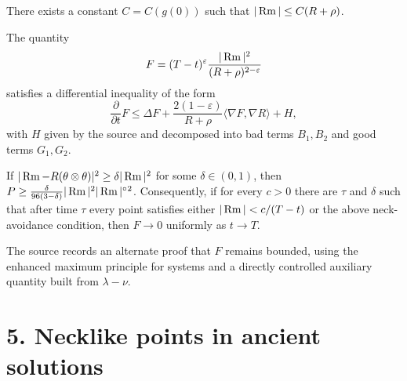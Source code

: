 \begin{lemma}
\label{ch09-lem-curvature-vs-scalar}
There exists a constant \(C=C(g(0))\) such that \(|\operatorname{Rm}|\le C(R+\rho)\).
\end{lemma}

\begin{lemma}
\label{ch09-lem-modified-pinching-evolution}
The quantity
\[
F=(T-t)^\varepsilon \frac{|\operatorname{Rm}|^2}{(R+\rho)^{2-\varepsilon}}
\]
satisfies a differential inequality of the form
\[
\frac{\partial}{\partial t}F\le \Delta F+\frac{2(1-\varepsilon)}{R+\rho}\langle \nabla F,\nabla R\rangle+H,
\]
with \(H\) given by the source and decomposed into bad terms \(B_1,B_2\) and good terms \(G_1,G_2\).
\end{lemma}

\begin{lemma}
\label{ch09-lem-pinching-improves-away-from-necks}
If \(|\operatorname{Rm}-R(\theta\otimes\theta)|^2\ge \delta |\operatorname{Rm}|^2\) for some \(\delta\in(0,1)\), then \(P\ge \frac{\delta}{96(3-\delta)}|\operatorname{Rm}|^2|\operatorname{Rm}|^{\circ}{}^2\). Consequently, if for every \(c>0\) there are \(\tau\) and \(\delta\) such that after time \(\tau\) every point satisfies either \(|\operatorname{Rm}|<c/(T-t)\) or the above neck-avoidance condition, then \(F\to 0\) uniformly as \(t\to T\).
\end{lemma}

\begin{remark}
\label{ch09-rem-alternate-boundedness-of-F}
The source records an alternate proof that \(F\) remains bounded, using the enhanced maximum principle for systems and a directly controlled auxiliary quantity built from \(\lambda-\nu\).
\end{remark}

\section*{5. Necklike points in ancient solutions}

